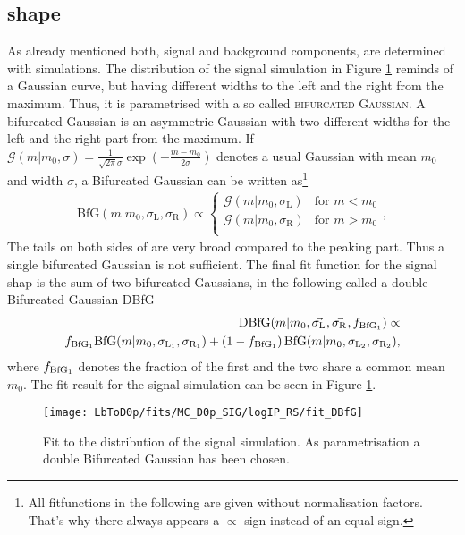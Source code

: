 \subsection{\logIP shape}
As already mentioned both, \logIP signal and background components, are determined with simulations.
The \logIP distribution of the signal simulation in Figure \ref{fig:fit_logIP_signal} reminds of a Gaussian curve, but having different widths to the left and the right from the maximum.
Thus, it is parametrised with a so called \textsc{bifurcated Gaussian}.
A bifurcated Gaussian is an asymmetric Gaussian with two different widths for the left and the right part from the maximum.
If $\mathcal{G}(m|m_0,\sigma) = \frac{1}{\sqrt{2\pi}\sigma}\exp\left(-\frac{m-m_0}{2\sigma}\right)$ denotes a usual Gaussian with mean $m_0$ and width $\sigma$, a Bifurcated Gaussian can be written as\footnote{All fitfunctions in the following are given without normalisation factors. That's why there always appears a $\propto$ sign instead of an equal sign.}
\begin{align}
    \text{BfG}(m|m_0, \sigma_{\text{L}}, \sigma_{\text{R}}) \propto 
    \begin{cases}
        \mathcal{G}(m|m_0,\sigma_{\text{L}}) & \text{for } m < m_0 \\   
        \mathcal{G}(m|m_0,\sigma_{\text{R}}) & \text{for } m > m_0 \\   
    \end{cases},
\end{align}
The tails on both sides of \logIP are very broad compared to the peaking part.
Thus a single bifurcated Gaussian is not sufficient.
The final fit function for the signal \logIP shap is the sum of two bifurcated Gaussians, in the following called a double Bifurcated Gaussian DBfG
\begin{align}
    \text{DBfG}(m|m_0,\vec{\sigma_{\text{L}_{}}}, \vec{\sigma_{\text{R}_{}}}, f_{\text{BfG}_1}) \propto \\
    f_{\text{BfG}_1} \text{BfG}(m|m_0,\sigma_{\text{L}_{1}}, \sigma_{\text{R}_{1}}) + \left(1 - f_{\text{BfG}_1} \right) \text{BfG}(m|m_0,\sigma_{\text{L}_{2}}, \sigma_{\text{R}_{2}}),
\end{align}
where $f_{\text{BfG}_1}$ denotes the fraction of the first \BfG and the two \BfG share a common mean $m_0$. 
The fit result for the signal simulation can be seen in Figure \ref{fig:fit_logIP_signal}.
\begin{figure}[hptb]
    \centering
	\texttt{[image: LbToD0p/fits/MC\_D0p\_SIG/logIP\_RS/fit\_DBfG]}
	\caption{Fit to the \logIP distribution of the signal simulation. As parametrisation a double Bifurcated Gaussian has been chosen.}
    \label{fig:fit_logIP_signal}
\end{figure}

